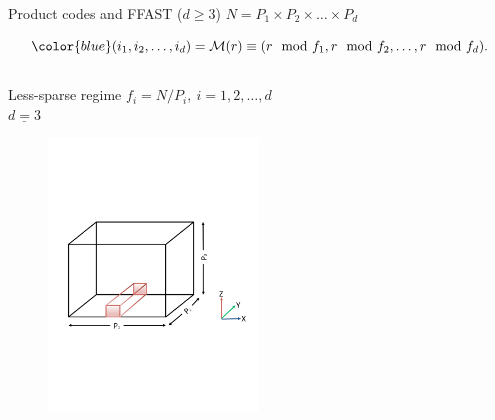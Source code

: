 	\begin{frame}{Product codes and FFAST ($d \geq 3$)}
	\color{blue}$N= P_1 \times P_2 \times \ldots \times P_d$
	
	\[\color{blue} (i_1,i_2,\ldots, i_d) = \mathcal{M}(r) \equiv (r \mod f_1, r \mod f_2, \ldots, r \mod f_d ).
	\]
	
	\begin{columns}
		\begin{block}{Less-sparse regime}
			\color{red} $f_i= N/P_i,\ i=1,2, \ldots,d$\\ \vspace{0.2in}
			\vspace{-2mm}
			\color{blue} $\underline{d=3}$
			\vspace{-3mm}
			\begin{figure}[t]
				\centering
				\includegraphics[width=2.2in]{./Figures/less-sparse}
			\end{figure}
			

\end{block}
\end{columns}
\end{frame}
